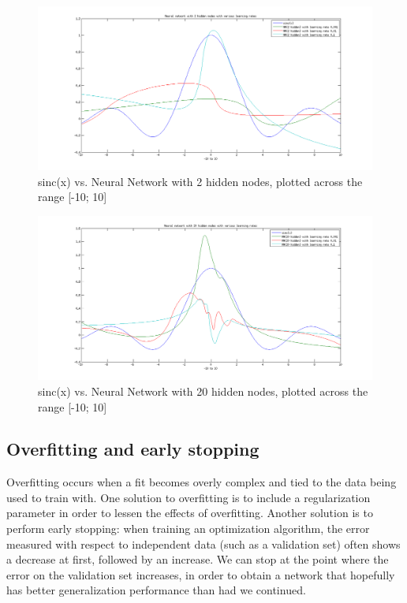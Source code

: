 \begin{figure}[h!]
  \includegraphics[width=\linewidth]{images/sinc2.png}
  \caption{sinc(x) vs. Neural Network with 2 hidden nodes, plotted across the range [-10; 10]
  \label{fig:sinc2}}
\end{figure}

\begin{figure}[h!]
  \includegraphics[width=\linewidth]{images/sinc20.png}
  \caption{sinc(x) vs. Neural Network with 20 hidden nodes, plotted across the range [-10; 10]
  \label{fig:sinc20}}
\end{figure}

\subsection*{Overfitting and early stopping}
Overfitting occurs when a fit becomes overly complex and tied to the data being used to train with.
One solution to overfitting is to include a regularization parameter in order to lessen the effects
of overfitting. Another solution is to perform early stopping: when training an optimization algorithm,
the error measured with respect to independent data (such as a validation set) often shows a decrease
at first, followed by an increase. We can stop at the point where the error on the validation set
increases, in order to obtain a network that hopefully has better generalization performance than had
we continued.

